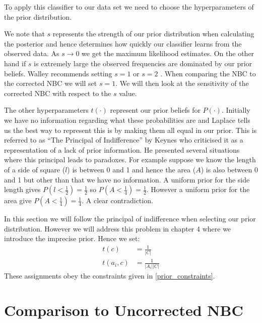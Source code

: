 To apply this classifier to our data set we need to choose the hyperparameters of the prior distribution.

We note that $s$ represents the strength of our prior distribution when calculating the posterior and hence determines how quickly our classifier learns from the observed data.
As $s \rightarrow 0$ we get the maximum likelihood estimates.
On the other hand if $s$ is extremely large the observed frequencies are dominated by our prior beliefs.
Walley recommends setting $s=1$ or $s=2$ \cite{Walley96}.
When comparing the NBC to the corrected NBC we will set $s=1$.
We will then look at the sensitivity of the corrected NBC with respect to the $s$ value.

The other hyperparameters $t(\cdot)$ represent our prior beliefs for $P(\cdot)$.
Initially we have no information regarding what these probabilities are and Laplace tells us \cite{laplace1812} the best way to represent this is by making them all equal in our prior.
This is referred to as ``The Principal of Indifference'' by Keynes \cite{Keynes21} who criticised it as a representation of a lack of prior information.
He presented several situations where this principal leads to paradoxes.
For example suppose we know the length of a side of square ($l$) is between 0 and 1 and hence the area ($A$) is also between 0 and 1 but other than that we have no information.
A uniform prior for the side length gives $P(l < \frac{1}{2}) = \frac{1}{2}$ so $P(A < \frac{1}{4}) = \frac{1}{2}$.
However a uniform prior for the area give $P(A < \frac{1}{4}) = \frac{1}{4}$. A clear contradiction.

In this section we will follow the principal of indifference when selecting our prior distribution.
However we will address this problem in chapter 4 where we introduce the imprecise prior.
Hence we set:
\begin{align}\label{initial prior}
	t(c)      & = \frac{1}{|C|} \\
	t(a_i, c) & = \frac{1}{|A_i||C|}
\end{align}
These assignments obey the constraints given in \cref{prior_constraints}.

\section{Comparison to Uncorrected NBC}



